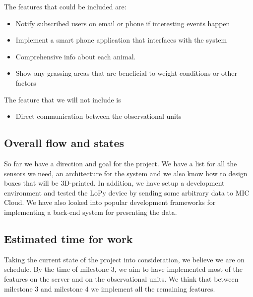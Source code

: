 		The features that could be included are:
		\begin{itemize}  
			\item Notify subscribed users on email or phone if interesting events happen
			\item Implement a smart phone application that interfaces with the system
			\item Comprehensive info about each animal.
			\item Show any grassing areas that are beneficial to weight conditions or other factors
		\end{itemize}
		
		The feature that we will not include is 
		\begin{itemize}
			\item Direct communication between the observational units
		\end{itemize}

	\subsection{Overall flow and states}
		So far we have a direction and goal for the project. We have a list for all the sensors we need, an architecture for the system and we also know how to design boxes that will be 3D-printed. In addition, we have setup a development environment and tested the LoPy device by sending some arbitrary data to MIC Cloud. We have also looked into popular development frameworks for implementing a back-end system for presenting the data.
	
	\subsection{Estimated time for work}
		Taking the current state of the project into consideration, we believe we are on schedule. By the time of milestone 3, we aim to have implemented most of the features on the server and on the observational units. We think that between milestone 3 and milestone 4 we implement all the remaining features. 
		
